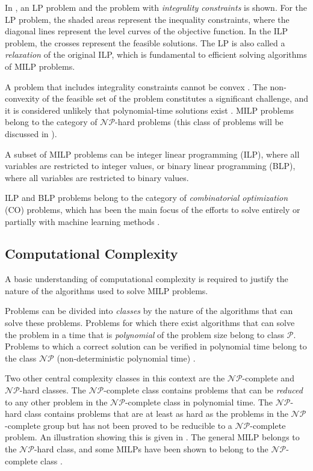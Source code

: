 In , an \gls{LP} problem and the problem with \textit{integrality constraints} is shown. For the \gls{LP} problem, the shaded areas represent the inequality constraints, where the diagonal lines represent the level curves of the objective function. In the \gls{ILP} problem, the crosses represent the feasible solutions. The \gls{LP} is also called a \textit{relaxation} of the original \gls{ILP}, which is fundamental to efficient solving algorithms of \gls{MILP} problems.

A problem that includes integrality constraints cannot be convex \cite{wolsey2020integer}. The non-convexity of the feasible set of the problem constitutes a significant challenge, and it is considered unlikely that polynomial-time solutions exist \cite{papadimitriou1982combinatorial}. \gls{MILP} problems belong to the category of $\mathcal{NP}$-hard problems \cite{papadimitriou1982combinatorial} (this class of problems will be discussed in ).   

A subset of \gls{MILP} problems can be integer linear programming (\gls{ILP}), where all variables are restricted to integer values, or binary linear programming (\gls{BLP}), where all variables are restricted to binary values. 

\gls{ILP} and \gls{BLP} problems belong to the category of \textit{combinatorial optimization} (\gls{CO}) problems, which has been the main focus of the efforts to solve entirely or partially with machine learning methods \cite{bengio2020machine}. 




\subsection{Computational Complexity}\label{ssec:complexity}

A basic understanding of computational complexity is required to justify the nature of the algorithms used to solve \gls{MILP} problems. 

Problems can be divided into \textit{classes} by the nature of the algorithms that can solve these problems. Problems for which there exist algorithms that can solve the problem in a time that is \textit{polynomial} of the problem size belong to class $\mathcal{P}$. Problems to which a correct solution can be verified in polynomial time belong to the class $\mathcal{NP}$ (non-deterministic polynomial time) \cite{cormen2009introduction}. 


Two other central complexity classes in this context are the $\mathcal{NP}$-complete and $\mathcal{NP}$-hard classes. The $\mathcal{NP}$-complete class contains problems that can be \textit{reduced} to any other problem in the $\mathcal{NP}$-complete class in polynomial time. 
The $\mathcal{NP}$-hard class contains problems that are at least as hard as the problems in the $\mathcal{NP}$-complete group but has not been proved to be reducible to a $\mathcal{NP}$-complete problem. An illustration showing this is given in . The general \gls{MILP} belongs to the $\mathcal{NP}$-hard class, and some \gls{MILP}s have been shown to belong to the $\mathcal{NP}$-complete class \cite{cormen2009introduction}. 


